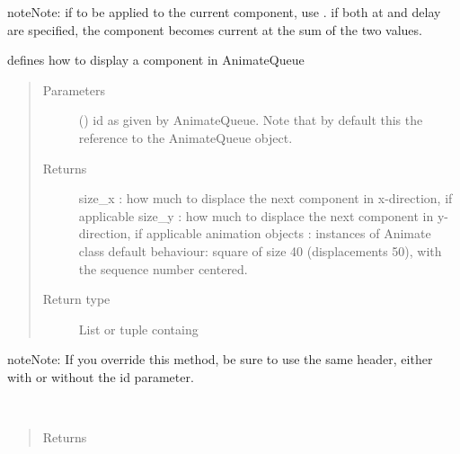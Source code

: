 \documentclass[letterpaper,10pt,english]{sphinxmanual}
\begin{document}
\begin{fulllineitems}
\begin{fulllineitems}
\begin{sphinxadmonition}{note}{Note:}
if to be applied to the current component, use . 
if both at and delay are specified, the component becomes current at the sum
of the two values.
\end{sphinxadmonition}

\end{fulllineitems}


\begin{fulllineitems}
\label{\detokenize{Reference:salabim.Component.animation_objects}}
defines how to display a component in AnimateQueue
\begin{quote}\begin{description}
\item[{Parameters}] \leavevmode
{} () \textendash{} id as given by AnimateQueue. Note that by default this the reference to the AnimateQueue object.

\item[{Returns}] \leavevmode
size\_x : how much to displace the next component in x-direction, if applicable 
size\_y : how much to displace the next component in y-direction, if applicable 
animation objects : instances of Animate class 
default behaviour: 
square of size 40 (displacements 50), with the sequence number centered.

\item[{Return type}] \leavevmode
List or tuple containg 

\end{description}\end{quote}

\begin{sphinxadmonition}{note}{Note:}
If you override this method, be sure to use the same header, either with or without the id parameter. 
\end{sphinxadmonition}

\end{fulllineitems}


\begin{fulllineitems}
\label{\detokenize{Reference:salabim.Component.base_name}}~\begin{quote}\begin{description}
\item[{Returns}] \leavevmode
{}


\end{description}
\end{quote}
\end{fulllineitems}
\end{fulllineitems}
\end{document}

